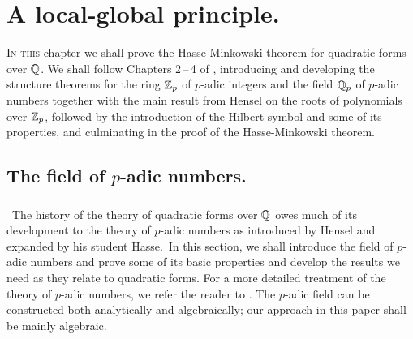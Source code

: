 \chapter{A local-global principle.}
\label{chap:local-global-principle}

{\scshape In this} chapter we shall prove the Hasse-Minkowski theorem for quadratic forms over \(\mathbb{Q}\). We shall follow Chapters 2\,--\,4 of \cite{serre2012course}, introducing and developing the structure theorems for the ring \(\mathbb{Z}_p\) of \(p\)-adic integers and the field \(\mathbb{Q}_p\) of \(p\)-adic numbers together with the main result from Hensel on the roots of polynomials over \(\mathbb{Z}_p\), followed by the introduction of the Hilbert symbol and some of its properties, and culminating in the proof of the Hasse-Minkowski theorem.

\section{The field of \(p\)-adic numbers.}

\subsection{}~The history of the theory of quadratic forms over \(\mathbb{Q}\) owes much of its development to the theory of \(p\)-adic numbers as introduced by Hensel and expanded by his student Hasse.\,\cite{hasse1922uber,hensel1913zahlentheorie} In this section, we shall introduce the field of \(p\)-adic numbers and prove some of its basic properties and develop the results we need as they relate to quadratic forms. For a more detailed treatment of the theory of \(p\)-adic numbers, we refer the reader to \cite{gouvea1997p,koblitzp}. The \(p\)-adic field can be constructed both analytically and algebraically; our approach in this paper shall be mainly algebraic.\label{sec:field-of-p-adic-numbers}


